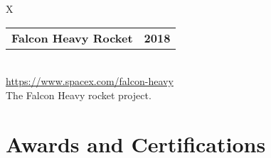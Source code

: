 \documentclass[10pt]{article}
\newcommand{\tabularxwidth}{\textwidth}
\begin{document}
        \begin{tabularx}{\tabularxwidth}{X}
                {
                    \begin{tabularx}{\tabularxwidth}{@{}X r}
                        \textbf{Falcon Heavy Rocket}
                        &
                        \textbf{
        2018} \\
                    \end{tabularx}
                } \\

            

            

            
                \url{https://www.spacex.com/falcon-heavy} \\
            

            
    The Falcon Heavy rocket project. \\

        \end{tabularx}

        

    



    \pagebreak[3]

    
        \section{Awards and Certifications}

    

    
        
\end{document}
